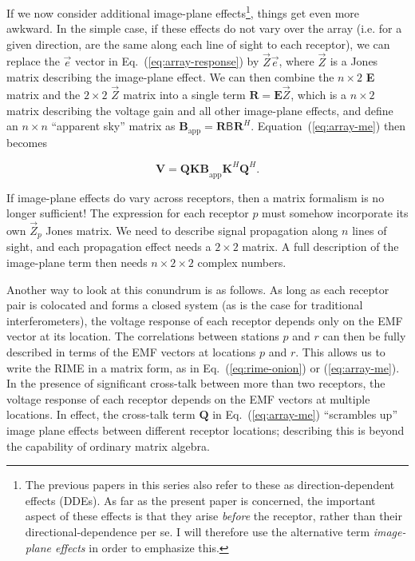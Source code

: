 \documentclass{aa}
\newcommand{\herm}{H}
\newcommand{\jones}[2]{\vec {#1}_{#2}}
\newcommand{\coh}[2]{\mathsf{{#1}}_{{#2}}}
\begin{document}
If we now consider additional image-plane effects\footnote{The previous papers in this series \citep{RRIME1,RRIME2,RRIME3} also refer to these as direction-dependent effects (DDEs). As far as the present paper is concerned, the important aspect of these effects is that they arise \emph{before} the receptor, rather than their directional-dependence per se. I will therefore use the alternative term \emph{image-plane effects} in order to emphasize this.}, things get even more awkward. In the simple case,
if these effects do not vary over the array (i.e. for a given direction, are the same along each line of sight to each receptor), 
we can replace the $\vec e$ vector in Eq.~(\ref{eq:array-response}) by $\jones{Z}{}\vec e$, where $\jones{Z}{}$ is a Jones matrix
describing the image-plane effect. We can then combine the $n\times2$
\textbf{E} matrix and the $2\times2$ $\jones{Z}{}$ matrix into a single
term $\mathbf{R}=\mathbf{E}\jones{Z}{}$, which is a $n\times2$ matrix describing
the voltage gain and all other image-plane effects, and define an $n\times n$ ``apparent
sky'' matrix as $\mathbf{B}_\mathrm{app} = \mathbf{R} \coh{B}{} \mathbf{R}^\herm$.  
Equation~(\ref{eq:array-me}) then becomes

\[
\mathbf{V}=\mathbf{QKB}_\mathrm{app} \mathbf{K}^\herm \mathbf{Q}^\herm.
\]

If image-plane effects do vary across receptors, then a matrix formalism
is no longer sufficient! The expression for each receptor
$p$ must somehow incorporate its own $\jones{Z}{p}$ Jones matrix.
We need to describe signal propagation along $n$ lines of sight,
and each propagation effect needs a $2\times2$ matrix. A full description of 
the image-plane term then needs $n\times2\times2$ complex numbers. 

Another way to look at this conundrum is as follows. As long as each
receptor pair is colocated and forms a closed system (as is the case
for traditional interferometers), the voltage response of each receptor
depends only on the EMF vector at its location. The correlations between
stations $p$ and $r$ can then be fully described in terms of the
EMF vectors at locations $p$ and $r$. This allows us to write the RIME
in a matrix form, as in Eq.~(\ref{eq:rime-onion}) or (\ref{eq:array-me}). In the presence of significant
cross-talk between more than two receptors, the voltage response of
each receptor depends on the EMF vectors at multiple locations. In effect,
the cross-talk term $\mathbf{Q}$ in Eq.~(\ref{eq:array-me}) ``scrambles up'' image plane effects between
different receptor locations; describing this is beyond the capability of ordinary matrix algebra.
\end{document}
